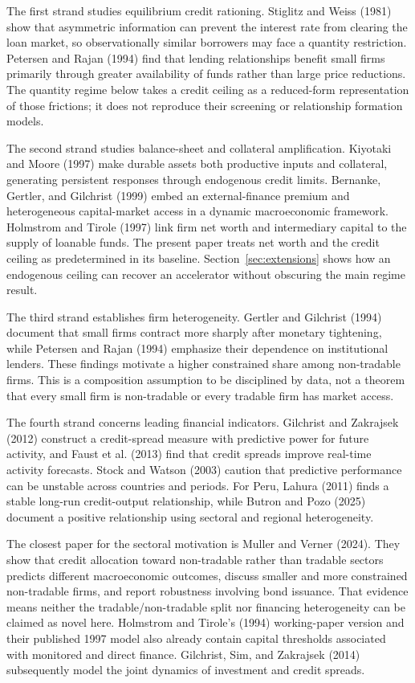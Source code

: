 \documentclass[11pt]{article}
\theoremstyle{definition}
\theoremstyle{remark}
\begin{document}
The first strand studies equilibrium credit rationing. Stiglitz and Weiss
(1981) show that asymmetric information can prevent the interest rate from
clearing the loan market, so observationally similar borrowers may face a
quantity restriction. Petersen and Rajan (1994) find that lending relationships
benefit small firms primarily through greater availability of funds rather
than large price reductions. The quantity regime below takes a credit ceiling
as a reduced-form representation of those frictions; it does not reproduce
their screening or relationship formation models.

The second strand studies balance-sheet and collateral amplification.
Kiyotaki and Moore (1997) make durable assets both productive inputs and
collateral, generating persistent responses through endogenous credit limits.
Bernanke, Gertler, and Gilchrist (1999) embed an external-finance premium and
heterogeneous capital-market access in a dynamic macroeconomic framework.
Holmstrom and Tirole (1997) link firm net worth and intermediary capital to the
supply of loanable funds. The present paper treats net worth and the credit
ceiling as predetermined in its baseline. Section~\ref{sec:extensions} shows
how an endogenous ceiling can recover an accelerator without obscuring the
main regime result.

The third strand establishes firm heterogeneity. Gertler and Gilchrist (1994)
document that small firms contract more sharply after monetary tightening,
while Petersen and Rajan (1994) emphasize their dependence on institutional
lenders. These findings motivate a higher constrained share among
non-tradable firms. This is a composition assumption to be disciplined by
data, not a theorem that every small firm is non-tradable or every tradable
firm has market access.

The fourth strand concerns leading financial indicators. Gilchrist and
Zakrajsek (2012) construct a credit-spread measure with predictive power for
future activity, and Faust et al. (2013) find that credit spreads improve
real-time activity forecasts. Stock and Watson (2003) caution that predictive
performance can be unstable across countries and periods. For Peru, Lahura
(2011) finds a stable long-run credit-output relationship, while Butron and
Pozo (2025) document a positive relationship using sectoral and regional
heterogeneity.

The closest paper for the sectoral motivation is Muller and Verner (2024).
They show that credit allocation toward non-tradable rather than tradable
sectors predicts different macroeconomic outcomes, discuss smaller and more
constrained non-tradable firms, and report robustness involving bond issuance.
That evidence means neither the tradable/non-tradable split nor financing
heterogeneity can be claimed as novel here. Holmstrom and Tirole's (1994)
working-paper version and their published 1997 model also already contain
capital thresholds associated with monitored and direct finance. Gilchrist,
Sim, and Zakrajsek (2014) subsequently model the joint dynamics of investment
and credit spreads.
\end{document}
